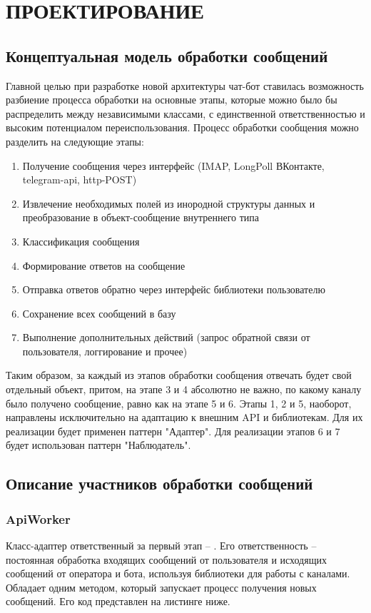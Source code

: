 \section{ПРОЕКТИРОВАНИЕ}
    \subsection{Концептуальная модель обработки сообщений}
    Главной целью при разработке новой архитектуры чат-бот ставилась возможность
    разбиение процесса обработки на основные этапы, которые можно было бы
    распределить между независимыми классами, с единственной ответственностью и
    высоким потенциалом переиспользования.
    Процесс обработки сообщения можно разделить на следующие этапы:
    \begin{enumerate}
        \item Получение сообщения через интерфейс (IMAP, LongPoll ВКонтакте, 
        telegram-api, http-POST)
        \item Извлечение необходимых полей из инородной структуры данных и 
        преобразование в объект-сообщение внутреннего типа
        \item Классификация сообщения
        \item Формирование ответов на сообщение
        \item Отправка ответов обратно через интерфейс библиотеки пользователю
        \item Сохранение всех сообщений в базу
        \item Выполнение дополнительных действий (запрос обратной связи от
        пользователя, логгирование и прочее)
    \end{enumerate}

    Таким образом, за каждый из этапов обработки сообщения отвечать будет свой 
    отдельный объект, притом, на этапе 3 и 4 абсолютно не важно, по какому 
    каналу было получено сообщение, равно как на этапе 5 и 6. Этапы 1, 2 и 5, 
    наоборот, направлены исключительно на адаптацию к внешним API и библиотекам.
    Для их реализации будет применен паттерн "Адаптер". Для реализации этапов
    6 и 7 будет использован паттерн "Наблюдатель".\cite{design.patterns}

    
    \subsection{Описание участников обработки сообщений}
    \subsubsection*{ApiWorker}
    Класс-адаптер ответственный за первый этап -- .
    Его ответственность -- постоянная обработка входящих сообщений от 
    пользователя и исходящих сообщений от оператора и бота, используя библиотеки
    для работы с каналами. Обладает одним методом, который запускает процесс 
    получения новых сообщений. Его код представлен на листинге ниже.

